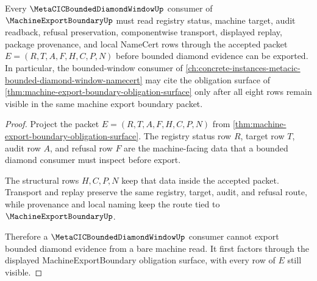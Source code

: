 \begin{theorem}
\label{thm:machine-export-boundary-bounded-diamond-consumer}
Every $\MetaCICBoundedDiamondWindowUp$ consumer of $\MachineExportBoundaryUp$ must read registry status, machine target, audit readback, refusal preservation, componentwise transport, displayed replay, package provenance, and local NameCert rows through the accepted packet $E=(R,T,A,F,H,C,P,N)$ before bounded diamond evidence can be exported. In particular, the bounded-window consumer of \autoref{ch:concrete-instances-metacic-bounded-diamond-window-namecert} may cite the obligation surface of \autoref{thm:machine-export-boundary-obligation-surface} only after all eight rows remain visible in the same machine export boundary packet.
\end{theorem}
\begin{proof}
Project the packet $E=(R,T,A,F,H,C,P,N)$ from \autoref{thm:machine-export-boundary-obligation-surface}. The registry status row $R$, target row $T$, audit row $A$, and refusal row $F$ are the machine-facing data that a bounded diamond consumer must inspect before export.

The structural rows $H,C,P,N$ keep that data inside the accepted packet. Transport and replay preserve the same registry, target, audit, and refusal route, while provenance and local naming keep the route tied to $\MachineExportBoundaryUp$.

Therefore a $\MetaCICBoundedDiamondWindowUp$ consumer cannot export bounded diamond evidence from a bare machine read. It first factors through the displayed MachineExportBoundary obligation surface, with every row of $E$ still visible.
\end{proof}

